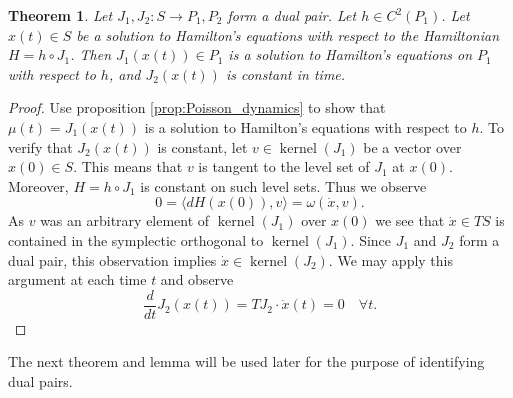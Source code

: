 \documentclass[12pt]{amsart}
\newtheorem{thm}{Theorem}[section]
\DeclareMathOperator{\kernel}{kernel}
\begin{document}
  \begin{thm} \label{thm:dual_pairs}
    Let $J_1,J_2:S \to P_1,P_2$ form a dual pair.
    Let $h \in C^2(P_1)$.
    Let $x(t) \in S$ be a solution to Hamilton's equations
    with respect to the Hamiltonian $H = h \circ J_1$.
    Then $J_1\left( x(t) \right) \in P_1$ is a solution
    to Hamilton's equations on $P_1$ with respect to $h$,
    and $J_2( x(t))$ is constant in time.
  \end{thm}
  \begin{proof}
    Use proposition \ref{prop:Poisson_dynamics} to show that
    $\mu(t) = J_1 (x(t))$ is a solution to Hamilton's equations
    with respect to $h$.
    To verify that $J_2( x(t) )$ is constant,
    let $v \in \kernel(J_1)$ be a vector over $x(0) \in S$.
    This means that $v$ is tangent to the level set of $J_1$ at $x(0)$.
    Moreover, $H = h \circ J_1$ is constant on such level sets.
    Thus we observe
    \begin{equation*}
      0 = \langle dH(x(0)) , v \rangle =
      \omega \left( \dot{x} , v \right).
    \end{equation*}
    As $v$ was an arbitrary element of $\kernel(J_1)$ over $x(0)$
    we see that $\dot{x} \in TS$ is contained
    in the symplectic orthogonal to $\kernel(J_1)$.
    Since $J_1$ and $J_2$ form a dual pair,
    this observation implies $\dot{x} \in \kernel(J_2)$.
    We may apply this argument at each time $t$ and observe
    \begin{equation*}
      \frac{d}{dt} J_2( x(t)) = TJ_2 \cdot \dot{x}(t)  
      = 0 \quad \forall t.
    \end{equation*}
  \end{proof}

  The next theorem and lemma will be used later for the purpose of
  identifying dual pairs.
\end{document}
